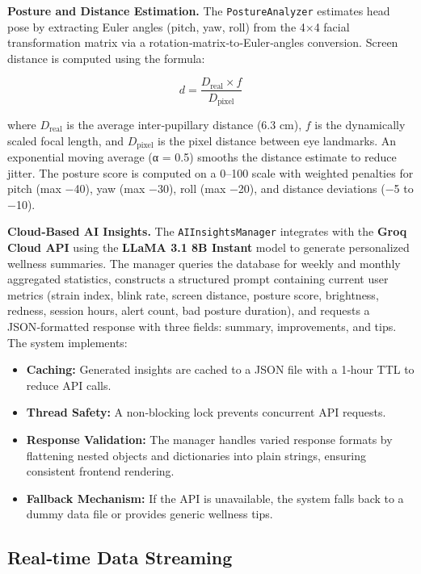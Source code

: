 \documentclass[12pt]{report}
\begin{document}
\textbf{Posture and Distance Estimation.} The \texttt{PostureAnalyzer} estimates head pose by extracting Euler angles (pitch, yaw, roll) from the 4×4 facial transformation matrix via a rotation‑matrix‑to‑Euler‑angles conversion. Screen distance is computed using the formula:

\[
d = \frac{D_{\text{real}} \times f}{D_{\text{pixel}}}
\]

where $D_{\text{real}}$ is the average inter‑pupillary distance (6.3 cm), $f$ is the dynamically scaled focal length, and $D_{\text{pixel}}$ is the pixel distance between eye landmarks. An exponential moving average (α = 0.5) smooths the distance estimate to reduce jitter. The posture score is computed on a 0–100 scale with weighted penalties for pitch (max −40), yaw (max −30), roll (max −20), and distance deviations (−5 to −10).

\textbf{Cloud‑Based AI Insights.} The \texttt{AIInsightsManager} integrates with the \textbf{Groq Cloud API} using the \textbf{LLaMA 3.1 8B Instant} model to generate personalized wellness summaries. The manager queries the database for weekly and monthly aggregated statistics, constructs a structured prompt containing current user metrics (strain index, blink rate, screen distance, posture score, brightness, redness, session hours, alert count, bad posture duration), and requests a JSON‑formatted response with three fields: summary, improvements, and tips. The system implements:

\begin{itemize}
    \item \textbf{Caching:} Generated insights are cached to a JSON file with a 1‑hour TTL to reduce API calls.
    \item \textbf{Thread Safety:} A non‑blocking lock prevents concurrent API requests.
    \item \textbf{Response Validation:} The manager handles varied response formats by flattening nested objects and dictionaries into plain strings, ensuring consistent frontend rendering.
    \item \textbf{Fallback Mechanism:} If the API is unavailable, the system falls back to a dummy data file or provides generic wellness tips.
\end{itemize}

\subsection{Real‑time Data Streaming}
\end{document}
